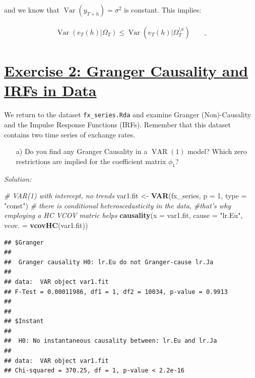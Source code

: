 \documentclass[12pt,a4paper]{article}
\newcommand{\Var}{\operatorname{Var}} %
\newcommand{\VAR}{\operatorname{VAR}} %
\newcommand{\tmpsection}[1]{}
\let\tmpsection=\section
\renewcommand{\section}[1]{\tmpsection{\underline{#1}} }
\newenvironment{Shaded}{\begin{snugshade}}{\end{snugshade}}
\newcommand{\CommentTok}[1]{\textcolor[rgb]{0.56,0.35,0.01}{\textit{#1}}}
\newcommand{\DataTypeTok}[1]{\textcolor[rgb]{0.13,0.29,0.53}{#1}}
\newcommand{\DecValTok}[1]{\textcolor[rgb]{0.00,0.00,0.81}{#1}}
\newcommand{\KeywordTok}[1]{\textcolor[rgb]{0.13,0.29,0.53}{\textbf{#1}}}
\newcommand{\NormalTok}[1]{#1}
\newcommand{\StringTok}[1]{\textcolor[rgb]{0.31,0.60,0.02}{#1}}
\begin{document}
and we know that \(\Var(y_{T +h}) = \sigma^2\) is constant. This
implies:

\begin{align*}
\Var\left(e_T (h) | \Omega_T \right) \leq \Var \left( e_T (h) | \Omega_T^{\setminus x} \right) \qquad _{\square}
\end{align*}

\hypertarget{exercise-2-granger-causality-and-irfs-in-data}{%
\section{Exercise 2: Granger Causality and IRFs in
Data}\label{exercise-2-granger-causality-and-irfs-in-data}}

We return to the dataset \texttt{fx\_series.Rda} and examine Granger
(Non)-Causality and the Impulse Response Functions (IRFs). Remember that
this dataset contains two time series of exchange rates.

\begin{itemize}
  \item[a)] Do you find any Granger Causality in a $\VAR(1)$ model? Which zero restrictions are implied for the coefficient matrix $\phi_1$?
\end{itemize}

\emph{Solution:}

\begin{Shaded}
\begin{Highlighting}[]
\CommentTok{# VAR(1) with intercept, no trends}
\NormalTok{var1.fit <-}\StringTok{ }\KeywordTok{VAR}\NormalTok{(fx_series, }\DataTypeTok{p =} \DecValTok{1}\NormalTok{, }\DataTypeTok{type =} \StringTok{"const"}\NormalTok{) }
\CommentTok{# there is conditional heteroscedasticity in the data, }
\CommentTok{#that's why employing a HC VCOV matric helps}
\KeywordTok{causality}\NormalTok{(}\DataTypeTok{x =}\NormalTok{ var1.fit, }\DataTypeTok{cause =} \StringTok{"lr.Eu"}\NormalTok{, }\DataTypeTok{vcov. =} \KeywordTok{vcovHC}\NormalTok{(var1.fit)) }
\end{Highlighting}
\end{Shaded}

\begin{verbatim}
## $Granger
## 
##  Granger causality H0: lr.Eu do not Granger-cause lr.Ja
## 
## data:  VAR object var1.fit
## F-Test = 0.00011986, df1 = 1, df2 = 10034, p-value = 0.9913
## 
## 
## $Instant
## 
##  H0: No instantaneous causality between: lr.Eu and lr.Ja
## 
## data:  VAR object var1.fit
## Chi-squared = 370.25, df = 1, p-value < 2.2e-16
\end{verbatim}
\end{document}

